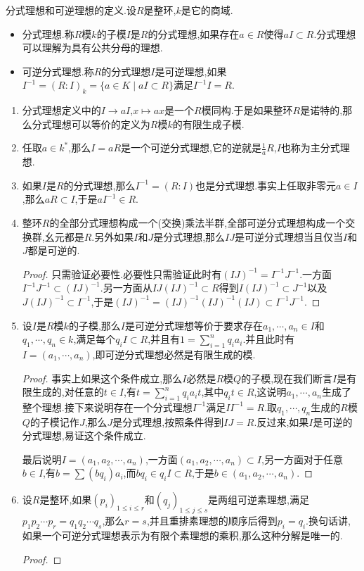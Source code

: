 分式理想和可逆理想的定义.设$R$是整环,$k$是它的商域.
\begin{itemize}
	\item 分式理想.称$R$模$k$的子模$I$是$R$的分式理想,如果存在$a\in R$使得$aI\subset R$.分式理想可以理解为具有公共分母的理想.
	\item 可逆分式理想.称$R$的分式理想$I$是可逆理想,如果$I^{-1}=(R:I)_k=\{a\in K\mid aI\subset R\}$满足$I^{-1}I=R$.
\end{itemize}
\begin{enumerate}
	\item 分式理想定义中的$I\to aI$,$x\mapsto ax$是一个$R$模同构.于是如果整环$R$是诺特的,那么分式理想可以等价的定义为$R$模$k$的有限生成子模.
	\item 任取$a\in k^*$,那么$I=aR$是一个可逆分式理想,它的逆就是$\frac{1}{a}R$,$I$也称为主分式理想.
	\item 如果$I$是$R$的分式理想,那么$I^{-1}=(R:I)$也是分式理想.事实上任取非零元$a\in I$,那么$aR\subset I$,于是$aI^{-1}\in R$.
	\item 整环$R$的全部分式理想构成一个(交换)乘法半群,全部可逆分式理想构成一个交换群,幺元都是$R$.另外如果$I$和$J$是分式理想,那么$IJ$是可逆分式理想当且仅当$I$和$J$都是可逆的.
	\begin{proof}
		
		只需验证必要性.必要性只需验证此时有$(IJ)^{-1}=I^{-1}J^{-1}$.一方面$I^{-1}J^{-1}\subset(IJ)^{-1}$.另一方面从$IJ(IJ)^{-1}\subset R$得到$I(IJ)^{-1}\subset J^{-1}$以及$J(IJ)^{-1}\subset I^{-1}$,于是$(IJ)^{-1}=(IJ)^{-1}(IJ)^{-1}(IJ)\subset I^{-1}J^{-1}$.
	\end{proof}
	\item 设$I$是$R$模$k$的子模,那么$I$是可逆分式理想等价于要求存在$a_1,\cdots,a_n\in I$和$q_1,\cdots,q_n\in k$,满足每个$q_iI\subset R$,并且有$1=\sum_{i=1}^{n}q_ia_i$.并且此时有$I=(a_1,\cdots,a_n)$,即可逆分式理想必然是有限生成的模.
	\begin{proof}
		
		事实上如果这个条件成立,那么$I$必然是$R$模$Q$的子模,现在我们断言$I$是有限生成的,对任意的$t\in I$,有$t=\sum_{i=1}^{n}q_ia_it$,其中$q_it\in R$,这说明$a_1,\cdots,a_n$生成了整个理想.接下来说明存在一个分式理想$I^{-1}$满足$II^{-1}=R$.取$q_1,\cdots,q_n$生成的$R$模$Q$的子模记作$J$,那么$J$是分式理想,按照条件得到$IJ=R$.反过来,如果$I$是可逆的分式理想,易证这个条件成立.
		
		最后说明$I=(a_1,a_2,\cdots,a_n)$,一方面$(a_1,a_2,\cdots,a_n)\subset I$,另一方面对于任意$b\in I$,有$b=\sum(bq_i)a_i$,而$bq_i\in q_iI\subset R$,于是$b\in(a_1,a_2,\cdots,a_n)$.
	\end{proof}
	\item 设$R$是整环,如果$(p_i)_{1\le i\le r}$和$(q_j)_{1\le j\le s}$是两组可逆素理想,满足$p_1p_2\cdots p_r=q_1q_2\cdots q_s$,那么$r=s$,并且重排素理想的顺序后得到$p_i=q_i$.换句话讲,如果一个可逆分式理想表示为有限个素理想的乘积,那么这种分解是唯一的.
	\begin{proof}
		

\end{proof}
\end{enumerate}
